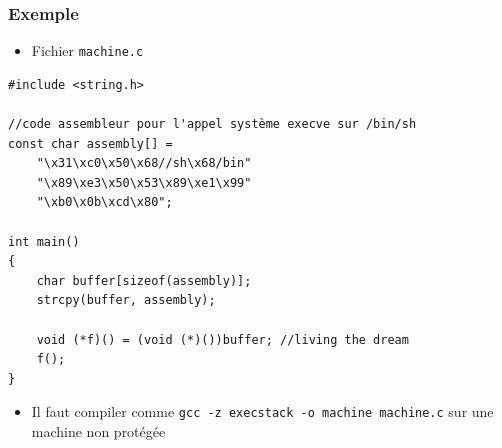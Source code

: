 \begin{frame}[containsverbatim]
\frametitle{Exemple}
\begin{itemize}
\item Fichier \texttt{machine.c}
\end{itemize}
\begin{lstlisting}
#include <string.h>

//code assembleur pour l'appel système execve sur /bin/sh
const char assembly[] = 
	"\x31\xc0\x50\x68//sh\x68/bin"
	"\x89\xe3\x50\x53\x89\xe1\x99"
	"\xb0\x0b\xcd\x80";

int main()
{
	char buffer[sizeof(assembly)];
	strcpy(buffer, assembly);

	void (*f)() = (void (*)())buffer; //living the dream
	f();
}
\end{lstlisting}
\begin{itemize}
\item Il faut compiler comme \texttt{gcc -z execstack -o machine machine.c} sur une machine non protégée
\end{itemize}
\end{frame}


